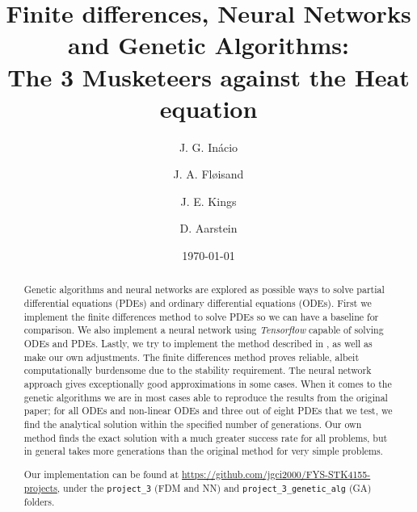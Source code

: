 \documentclass[aps,reprint,superscriptaddress,nofootinbib]{revtex4-2}
\begin{document}

\title{Finite differences, Neural Networks and Genetic Algorithms:\\The 3 Musketeers against the Heat equation} %






\author{J. G. Inácio}
\author{J. A. Fløisand}
\author{J. E. Kings}
\author{D. Aarstein}
\date{\today}
\begin{abstract}
    Genetic algorithms and neural networks are explored as possible ways to solve partial differential equations (PDEs) and ordinary differential equations (ODEs). First we implement the finite differences method to solve PDEs so we can have a baseline for comparison. We also implement a neural network using \textit{Tensorflow} capable of solving ODEs and PDEs. Lastly, we try to implement the method described in \cite{solving_diff_reproduce}, as well as make our own adjustments. The finite differences method proves reliable, albeit computationally burdensome due to the stability requirement. The neural network approach gives exceptionally good approximations in some cases. When it comes to the genetic algorithms we are in most cases able to reproduce the results from the original paper; for all ODEs and non-linear ODEs and three out of eight PDEs that we test, we find the analytical solution within the specified number of generations. Our own method finds the exact solution with a much greater success rate for all problems, but in general takes more generations than the original method for very simple problems.
    
    Our implementation can be found at \url{https://github.com/jgci2000/FYS-STK4155-projects}, under the \texttt{project\_3} (FDM and NN) and \texttt{project\_3\_genetic\_alg} (GA) folders.
\end{abstract}
\end{document}
